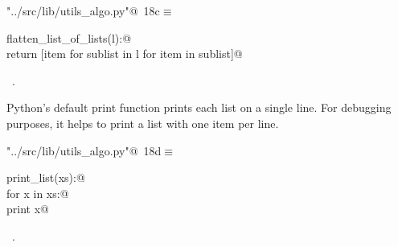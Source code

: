 \documentclass[11.5pt]{report}
\begin{document}
\begin{flushleft} \small
\begin{minipage}{\linewidth}\label{scrap15}\raggedright\small
{} \verb@"../src/lib/utils_algo.py"@\nobreak\ {\footnotesize {18c}}$\equiv$
\vspace{-1ex}
\begin{list}{}{} \item
\mbox{}\verb@def flatten_list_of_lists(l):@\\
\mbox{}\verb@       return [item for sublist in l for item in sublist]@\\
\mbox{}\verb@@{\NWsep}
\end{list}
\vspace{-1.5ex}
\footnotesize
\begin{list}{}{\setlength{\itemsep}{-\parsep}\setlength{\itemindent}{-\leftmargin}}
\item \NWtxtFileDefBy\ .

\item{}
\end{list}
\end{minipage}\vspace{4ex}
\end{flushleft}

\vspace{-0.8cm}
\newchunk Python's default print function prints each list on a single line. For 
debugging purposes,  it helps to print a list with one item per line. 

\begin{flushleft} \small\label{scrap16}\raggedright\small
{} \verb@"../src/lib/utils_algo.py"@\nobreak\ {\footnotesize {18d}}$\equiv$
\vspace{-1ex}
\begin{list}{}{} \item
\mbox{}\verb@def print_list(xs):@\\
\mbox{}\verb@    for x in xs:@\\
\mbox{}\verb@        print x@\\
\mbox{}\verb@@{\NWsep}
\end{list}
\vspace{-1.5ex}
\footnotesize
\begin{list}{}{\setlength{\itemsep}{-\parsep}\setlength{\itemindent}{-\leftmargin}}
\item \NWtxtFileDefBy\ .

\item{}
\end{list}
\vspace{4ex}
\end{flushleft}
\end{document}
